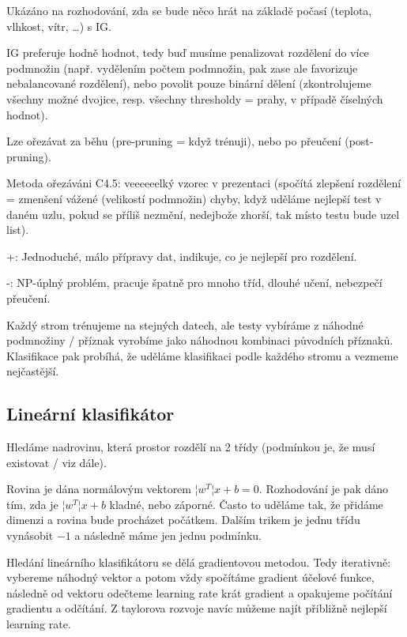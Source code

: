 \documentclass[12pt]{article}					%
\begin{document}
    \begin{priklady}
        Ukázáno na rozhodování, zda se bude něco hrát na základě počasí (teplota, vlhkost, vítr, …) s IG.
    \end{priklady}

    \begin{upozorneni}
        IG preferuje hodně hodnot, tedy buď musíme penalizovat rozdělení do více podmnožin (např. vydělením počtem podmnožin, pak zase ale favorizuje nebalancované rozdělení), nebo povolit pouze binární dělení (zkontrolujeme všechny možné dvojice, resp. všechny thresholdy = prahy, v případě číselných hodnot).
    \end{upozorneni}

    \begin{definice}[Ořezávání = pruning]
        Lze ořezávat za běhu (pre-pruning = když trénuji), nebo po přeučení (post-pruning).

        Metoda ořezáváni C4.5: veeeeeelký vzorec v prezentaci (spočítá zlepšení rozdělení = zmenšení vážené (velikostí podmnožin) chyby, když uděláme nejlepší test v daném uzlu, pokud se příliš nezmění, nedejbože zhorší, tak místo testu bude uzel list). 
    \end{definice}

    \begin{poznamka}
        +: Jednoduché, málo přípravy dat, indikuje, co je nejlepší pro rozdělení.

        -: NP-úplný problém, pracuje špatně pro mnoho tříd, dlouhé učení, nebezpečí přeučení.
    \end{poznamka}

    \begin{definice}
        Každý strom trénujeme na stejných datech, ale testy vybíráme z náhodné podmnožiny / příznak vyrobíme jako náhodnou kombinaci původních příznaků. Klasifikace pak probíhá, že uděláme klasifikaci podle každého stromu a vezmeme nejčastější.
    \end{definice}

    \subsection{Lineární klasifikátor}
        \begin{definice}
            Hledáme nadrovinu, která prostor rozdělí na 2 třídy (podmínkou je, že musí existovat / viz dále).

            Rovina je dána normálovým vektorem $¦w^T¦x + b = 0$. Rozhodování je pak dáno tím, zda je $¦w^T¦x + b$ kladné, nebo záporné. Často to uděláme tak, že přidáme dimenzi a rovina bude procházet počátkem. Dalším trikem je jednu třídu vynásobit $-1$ a následně máme jen jednu podmínku.

            Hledání lineárního klasifikátoru se dělá gradientovou metodou. Tedy iterativně: vybereme náhodný vektor a potom vždy spočítáme gradient účelové funkce, následně od vektoru odečteme learning rate krát gradient a opakujeme počítání gradientu a odčítání. Z taylorova rozvoje navíc můžeme najít přibližně nejlepší learning rate.
        \end{definice}
\end{document}
